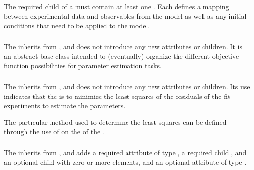 \paragraph*{}
The required \ListOfFitExperiments child of a \ParameterEstimationTask must contain at least one \FitExperiment.  Each \FitExperiment defines a mapping between experimental data and observables from the model as well as any initial conditions that need to be applied to the model.


\subsubsection{}
\label{class:objective}

The \Objective inherits from \SedBase, and does not introduce any new attributes or children.  It is an abstract base class intended to (eventually) organize the different objective function possibilities for parameter estimation tasks.



\subsubsection{}
\label{class:leastSquareObjectiveFunction}

The \LeastSquareObjectiveFunction inherits from \Objective, and does not introduce any new attributes or children.  Its use indicates that the \ParameterEstimationTask is to minimize the least squares of the residuals of the fit experiments to estimate the parameters.

The particular method used to determine the least squares can be defined through the use of \AlgorithmParameters on the \Algorithm of the \ParameterEstimationTask.


\subsubsection{}
\label{class:adjustableParameter}
\label{class:listOfExperimentReferences}

The \AdjustableParameter inherits from \SedBase, and adds a required attribute  of type \Target, a required child \Bounds, and an optional child \ListOfExperimentReferences with zero or more \ExperimentReference elements, and an optional attribute  of type .

